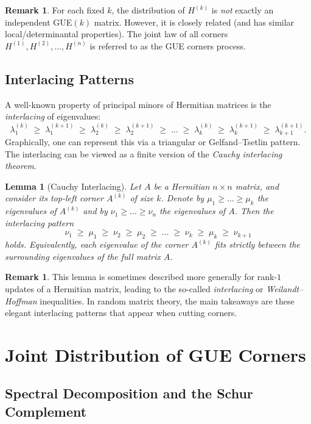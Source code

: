 \documentclass[letterpaper,11pt,oneside,reqno]{article}
\numberwithin{equation}{section}
\newtheorem{lemma}[proposition]{Lemma}
\theoremstyle{definition}
\newtheorem{remark}[proposition]{Remark}
\begin{document}
\begin{remark}
	For each fixed \(k\), the distribution of \(H^{(k)}\) is \emph{not} exactly an independent GUE\((k)\) matrix. However, it is closely related (and has similar local/determinantal properties). The joint law of all corners \(H^{(1)},H^{(2)},\dots,H^{(n)}\) is referred to as the GUE corners process.
\end{remark}

\subsection{Interlacing Patterns}

A well-known property of principal minors of Hermitian matrices is the \emph{interlacing} of eigenvalues:
\[
\lambda_1^{(k)} \;\ge\; \lambda_1^{(k+1)} \;\ge\; \lambda_2^{(k)} \;\ge\; \lambda_2^{(k+1)} \;\ge\; \dots \;\ge\; \lambda_k^{(k)} \;\ge\; \lambda_k^{(k+1)} \;\ge\; \lambda_{k+1}^{(k+1)}.
\]
Graphically, one can represent this via a triangular or Gelfand--Tsetlin pattern. The interlacing can be viewed as a finite version of the \emph{Cauchy interlacing theorem}.

\begin{lemma}[Cauchy Interlacing]
	Let \(A\) be a Hermitian \(n\times n\) matrix, and consider its top-left corner \(A^{(k)}\) of size \(k\). Denote by \(\mu_1\ge\dots\ge\mu_k\) the eigenvalues of \(A^{(k)}\) and by \(\nu_1\ge\dots\ge\nu_n\) the eigenvalues of \(A\). Then the interlacing pattern
	\[
		\nu_1\;\ge\;\mu_1\;\ge\;\nu_2\;\ge\;\mu_2\;\ge\;\dots\;\ge\;\nu_k\;\ge\;\mu_k\;\ge\;\nu_{k+1}
	\]
	holds. Equivalently, each eigenvalue of the corner \(A^{(k)}\) fits strictly between the surrounding eigenvalues of the full matrix \(A\).
\end{lemma}

\begin{remark}
This lemma is sometimes described more generally for rank-\(1\) updates of a Hermitian matrix, leading to the so-called \emph{interlacing} or \emph{Weilandt--Hoffman} inequalities. In random matrix theory, the main takeaways are these elegant interlacing patterns that appear when cutting corners.
\end{remark}

\section{Joint Distribution of GUE Corners}

\subsection{Spectral Decomposition and the Schur Complement}
\end{document}
